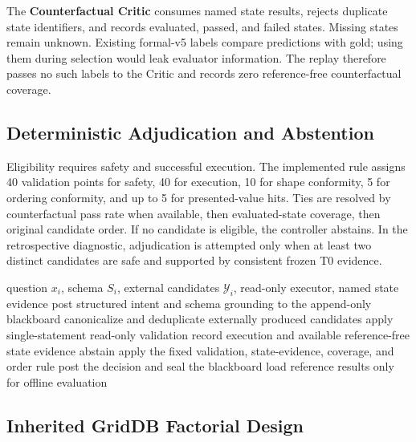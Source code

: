 \documentclass[applsci,article,submit,moreauthors]{Definitions/mdpi}
\begin{document}
The \textbf{Counterfactual Critic} consumes named state results, rejects duplicate state identifiers, and records evaluated, passed, and failed states. Missing states remain unknown. Existing formal-v5 labels compare predictions with gold; using them during selection would leak evaluator information. The replay therefore passes no such labels to the Critic and records zero reference-free counterfactual coverage.

\subsection{Deterministic Adjudication and Abstention}

Eligibility requires safety and successful execution. The implemented rule assigns 40 validation points for safety, 40 for execution, 10 for shape conformity, 5 for ordering conformity, and up to 5 for presented-value hits. Ties are resolved by counterfactual pass rate when available, then evaluated-state coverage, then original candidate order. If no candidate is eligible, the controller abstains. In the retrospective diagnostic, adjudication is attempted only when at least two distinct candidates are safe and supported by consistent frozen T0 evidence.

\begin{algorithm}[htbp]
\caption{Gold-isolated deterministic coordination}
\label{alg:coordination}
\begin{algorithmic}[1]
\REQUIRE question $x_i$, schema $S_i$, external candidates $\mathcal{Y}_i$, read-only executor, named state evidence
\STATE post structured intent and schema grounding to the append-only blackboard
\STATE canonicalize and deduplicate externally produced candidates
  \STATE apply single-statement read-only validation
  \STATE record execution and available reference-free state evidence
\ENDFOR
{}
  \STATE abstain
\ELSE
  \STATE apply the fixed validation, state-evidence, coverage, and order rule
\ENDIF
\STATE post the decision and seal the blackboard
\STATE load reference results only for offline evaluation
\end{algorithmic}
\end{algorithm}

\subsection{Inherited GridDB Factorial Design}
\end{document}
